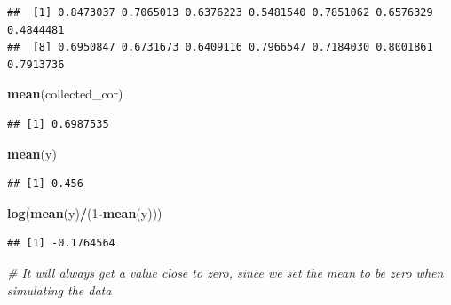 \documentclass[
]{book}
\newenvironment{Shaded}{\begin{snugshade}}{\end{snugshade}}
\newcommand{\CommentTok}[1]{\textcolor[rgb]{0.56,0.35,0.01}{\textit{#1}}}
\newcommand{\DecValTok}[1]{\textcolor[rgb]{0.00,0.00,0.81}{#1}}
\newcommand{\KeywordTok}[1]{\textcolor[rgb]{0.13,0.29,0.53}{\textbf{#1}}}
\newcommand{\NormalTok}[1]{#1}
\newcommand{\OperatorTok}[1]{\textcolor[rgb]{0.81,0.36,0.00}{\textbf{#1}}}
\begin{document}
\begin{verbatim}
##  [1] 0.8473037 0.7065013 0.6376223 0.5481540 0.7851062 0.6576329 0.4844481
##  [8] 0.6950847 0.6731673 0.6409116 0.7966547 0.7184030 0.8001861 0.7913736
\end{verbatim}

\begin{Shaded}
\begin{Highlighting}[]
\KeywordTok{mean}\NormalTok{(collected_cor)}
\end{Highlighting}
\end{Shaded}

\begin{verbatim}
## [1] 0.6987535
\end{verbatim}

\begin{Shaded}
\begin{Highlighting}[]
\KeywordTok{mean}\NormalTok{(y)}
\end{Highlighting}
\end{Shaded}

\begin{verbatim}
## [1] 0.456
\end{verbatim}

\begin{Shaded}
\begin{Highlighting}[]
\KeywordTok{log}\NormalTok{(}\KeywordTok{mean}\NormalTok{(y)}\OperatorTok{/}\NormalTok{(}\DecValTok{1}\OperatorTok{-}\KeywordTok{mean}\NormalTok{(y)))}
\end{Highlighting}
\end{Shaded}

\begin{verbatim}
## [1] -0.1764564
\end{verbatim}

\begin{Shaded}
\begin{Highlighting}[]
\CommentTok{# It will always get a value close to zero, since we set the mean to be zero when simulating the data}
\end{Highlighting}
\end{Shaded}

\backmatter
  
\end{document}
